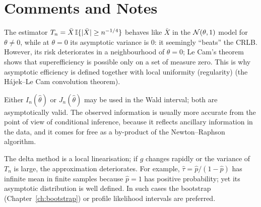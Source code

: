 \documentclass[main.tex]{subfiles}
\begin{document}
\section{Comments and Notes}

\begin{remark}
The estimator $T_n=\bar X\,\mathbb{I}\{|\bar X|\ge n^{-1/4}\}$ behaves like $\bar X$ in the $\mathcal{N}(\theta,1)$ model for $\theta\ne0$, while at $\theta=0$ its asymptotic variance is $0$: it seemingly ``beats'' the CRLB. However, its risk deteriorates in a neighbourhood of $\theta=0$; Le Cam's theorem \cite{lecam53} shows that superefficiency is possible only on a set of measure zero. This is why asymptotic efficiency is defined together with local uniformity (regularity) (the Hájek--Le Cam convolution theorem).
\end{remark}

\begin{remark}
Either $I_n(\hat\theta)$ or $J_n(\hat\theta)$ may be used in the Wald interval; both are asymptotically valid. The observed information is usually more accurate from the point of view of conditional inference, because it reflects ancillary information in the data, and it comes for free as a by-product of the Newton--Raphson algorithm.
\end{remark}

\begin{remark}
The delta method is a local linearisation; if $g$ changes rapidly or the variance of $T_n$ is large, the approximation deteriorates. For example, $\hat\tau=\hat p/(1-\hat p)$ has infinite mean in finite samples because $\hat p=1$ has positive probability; yet its asymptotic distribution is well defined. In such cases the bootstrap (Chapter~\ref{ch:bootstrap}) or profile likelihood intervals are preferred.
\end{remark}

\end{document}
